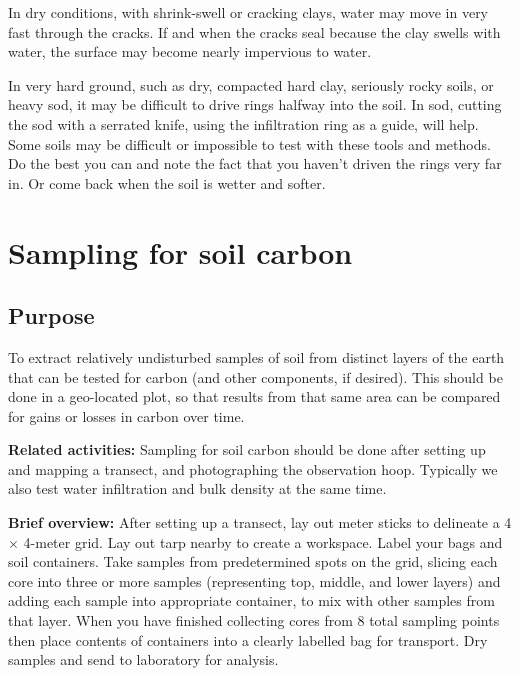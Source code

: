 \documentclass[11pt,letterpaper,twoside,onecolumn]{memoir}
\begin{document}
In dry conditions, with shrink-swell or cracking clays, water may move in very fast through the cracks. If and when the cracks seal because the clay swells with water, the surface may become nearly impervious to water.

In very hard ground, such as dry, compacted hard clay, seriously rocky soils, or heavy sod, it may be difficult to drive rings halfway into the soil. In sod, cutting the sod with a serrated knife, using the infiltration ring as a guide, will help. Some soils may be difficult or impossible to test with these tools and methods. Do the best you can and note the fact that you haven't driven the rings very far in. Or come back when the soil is wetter and softer.


\chapter{Sampling for soil carbon}

\section*{Purpose}

To extract relatively undisturbed samples of soil from distinct layers of the earth that can be tested for carbon (and other components, if desired). This should be done in a geo-located plot, so that results from that same area can be compared for gains or losses in carbon over time.

\textbf{Related activities:} Sampling for soil carbon should be done after setting up and mapping a transect, and photographing the observation hoop. Typically we also test water infiltration and bulk density at the same time.

\textbf{Brief overview:} After setting up a transect, lay out meter sticks to delineate a 4 $\times$ 4-meter grid. Lay out tarp nearby to create a workspace. Label your bags and soil containers. Take samples from predetermined spots on the grid, slicing each core into three or more samples (representing top, middle, and lower layers) and adding each sample into appropriate container, to mix with other samples from that layer. When you have finished collecting cores from 8 total sampling points then place contents of containers into a clearly labelled bag for transport.  Dry samples and send to laboratory for analysis.
\end{document}
